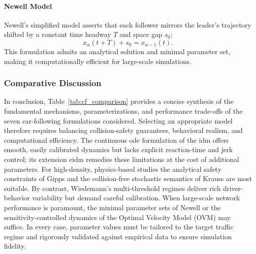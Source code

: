 \paragraph{Newell Model}  
Newell’s simplified model asserts that each follower mirrors the leader’s trajectory shifted by a constant time headway \(T\) and space gap \(s_0\):  
\[
x_\alpha(t+T) + s_0 = x_{\alpha-1}(t).
\]
This formulation admits an analytical solution and minimal parameter set, making it computationally efficient for large-scale simulations. \cite{Newell1961}

\subsubsection*{Comparative Discussion}
In conclusion, Table~\ref{tab:cf_comparison} provides a concise synthesis of the fundamental mechanisms, parameterizations, and performance trade-offs of the seven car-following formulations considered. Selecting an appropriate model therefore requires balancing collision-safety guarantees, behavioral realism, and computational efficiency. The continuous \ac{ode} formulation of the \ac{idm} offers smooth, easily calibrated dynamics but lacks explicit reaction-time and jerk control; its extension \ac{eidm} remedies these limitations at the cost of additional parameters. For high-density, physics-based studies the analytical safety constraints of Gipps and the collision-free stochastic semantics of Krauss are most suitable. By contrast, Wiedemann’s multi-threshold regimes deliver rich driver-behavior variability but demand careful calibration. When large-scale network performance is paramount, the minimal parameter sets of Newell or the sensitivity-controlled dynamics of the Optimal Velocity Model (OVM) may suffice. In every case, parameter values must be tailored to the target traffic regime and rigorously validated against empirical data to ensure simulation fidelity.  

